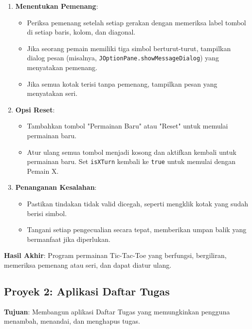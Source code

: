 \begin{enumerate}
	\item \textbf{Menentukan Pemenang}:
	\begin{itemize}
		\item Periksa pemenang setelah setiap gerakan dengan memeriksa label tombol di setiap baris, kolom, dan diagonal.
		\item Jika seorang pemain memiliki tiga simbol berturut-turut, tampilkan dialog pesan (misalnya, \texttt{JOptionPane.showMessageDialog}) yang menyatakan pemenang.
		\item Jika semua kotak terisi tanpa pemenang, tampilkan pesan yang menyatakan seri.
	\end{itemize}
	
	\item \textbf{Opsi Reset}:
	\begin{itemize}
		\item Tambahkan tombol "Permainan Baru" atau "Reset" untuk memulai permainan baru.
		\item Atur ulang semua tombol menjadi kosong dan aktifkan kembali untuk permainan baru. Set \texttt{isXTurn} kembali ke \texttt{true} untuk memulai dengan Pemain X.
	\end{itemize}
	
	\item \textbf{Penanganan Kesalahan}:
	\begin{itemize}
		\item Pastikan tindakan tidak valid dicegah, seperti mengklik kotak yang sudah berisi simbol.
		\item Tangani setiap pengecualian secara tepat, memberikan umpan balik yang bermanfaat jika diperlukan.
	\end{itemize}
\end{enumerate}

\textbf{Hasil Akhir}: Program permainan Tic-Tac-Toe yang berfungsi, bergiliran, memeriksa pemenang atau seri, dan dapat diatur ulang.

\subsection*{Proyek 2: Aplikasi Daftar Tugas}
\textbf{Tujuan}: Membangun aplikasi Daftar Tugas yang memungkinkan pengguna menambah, menandai, dan menghapus tugas.

